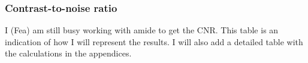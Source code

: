 \documentclass[twocolumn]{article}
\begin{document}
\subsubsection{Contrast-to-noise ratio}
I (Fea) am still busy working with amide to get the CNR. This table is an indication of how I will represent the results. I will also add a detailed table with the calculations in the appendices. 
\begin{table}[h]
    \centering
\end{table}
\end{document}
